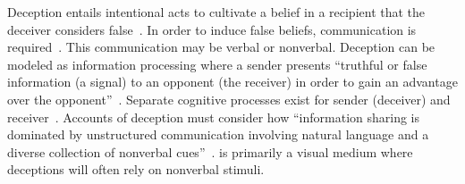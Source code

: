 Deception entails intentional acts to cultivate a belief in a recipient that the deceiver considers false~\cite{mitchell1986deception,zuckerman:1981}.
In order to induce false beliefs, communication is required~\cite{mitchell:1996}.
This communication may be verbal or nonverbal.
Deception can be modeled as information processing where a  %
sender presents ``truthful or false information (a signal) to an opponent (the receiver) in order to gain an advantage over the opponent''~\cite{cranford:2021}.
Separate cognitive processes exist for sender (deceiver) and receiver~\cite{jenkins:2016}. 
Accounts of deception must consider how ``information sharing is dominated by unstructured communication involving natural language and a diverse collection of nonverbal cues''~\cite{jenkins:2016}.
\MR is primarily a visual medium where deceptions will often rely on nonverbal stimuli.


